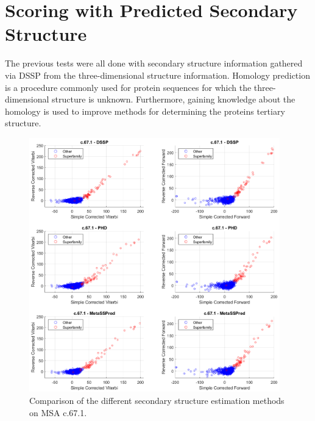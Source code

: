 \newpage

\section{Scoring with Predicted Secondary Structure}

The previous tests were all done with secondary structure information gathered via \ac{DSSP} from the three-dimensional structure information. 
Homology prediction is a procedure commonly used for protein sequences for which the three-dimensional structure is unknown.
Furthermore, gaining knowledge about the homology is used to improve methods for determining the proteins tertiary structure.

\begin{figure}[!b]
	\begin{center}
		\includegraphics[width=0.97\textwidth]{fig/SS_NE}
	\end{center}
	\caption[Comparision of the different secondary structure estimation methods.]{Comparison of the different secondary structure estimation methods on \acs{MSA} c.67.1. }
	\label{fig:scattBssp}
\end{figure}

